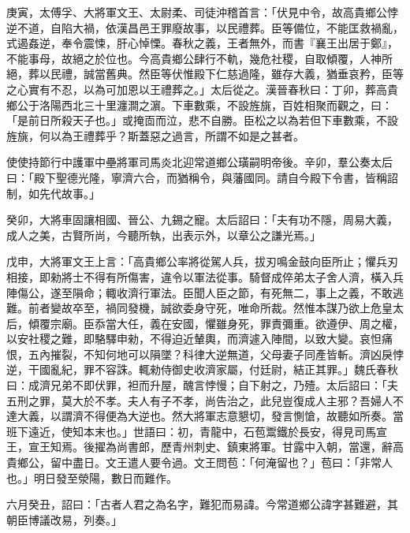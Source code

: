 \begin{pinyinscope}
庚寅，太傅孚、大將軍文王、太尉柔、司徒沖稽首言：「伏見中令，故高貴鄉公悖逆不道，自陷大禍，依漢昌邑王罪廢故事，以民禮葬。臣等備位，不能匡救禍亂，式遏姦逆，奉令震悚，肝心悼慄。春秋之義，王者無外，而書『襄王出居于鄭』，不能事母，故絕之於位也。今高貴鄉公肆行不軌，幾危社稷，自取傾覆，人神所絕，葬以民禮，誠當舊典。然臣等伏惟殿下仁慈過隆，雖存大義，猶垂哀矜，臣等之心實有不忍，以為可加恩以王禮葬之。」太后從之。漢晉春秋曰：丁卯，葬高貴鄉公于洛陽西北三十里瀍澗之濵。下車數乘，不設旌旐，百姓相聚而觀之，曰：「是前日所殺天子也。」或掩靣而泣，悲不自勝。臣松之以為若但下車數乘，不設旌旐，何以為王禮葬乎？斯蓋惡之過言，所謂不如是之甚者。

使使持節行中護軍中壘將軍司馬炎北迎常道鄉公璜嗣明帝後。辛卯，羣公奏太后曰：「殿下聖德光隆，寧濟六合，而猶稱令，與藩國同。請自今殿下令書，皆稱詔制，如先代故事。」

癸卯，大將車固讓相國、晉公、九錫之寵。太后詔曰：「夫有功不隱，周易大義，成人之美，古賢所尚，今聽所執，出表示外，以章公之謙光焉。」

戊申，大將軍文王上言：「高貴鄉公率將從駕人兵，拔刃鳴金鼓向臣所止；懼兵刃相接，即勑將士不得有所傷害，違令以軍法從事。騎督成倅弟太子舍人濟，橫入兵陣傷公，遂至隕命；輙收濟行軍法。臣聞人臣之節，有死無二，事上之義，不敢逃難。前者變故卒至，禍同發機，誠欲委身守死，唯命所裁。然惟本謀乃欲上危皇太后，傾覆宗廟。臣忝當大任，義在安國，懼雖身死，罪責彌重。欲遵伊、周之權，以安社稷之難，即駱驛申勑，不得迫近輦輿，而濟遽入陣間，以致大變。哀怛痛恨，五內摧裂，不知何地可以隕墜？科律大逆無道，父母妻子同產皆斬。濟凶戾悖逆，干國亂紀，罪不容誅。輒勑侍御史收濟家屬，付廷尉，結正其罪。」魏氏春秋曰：成濟兄弟不即伏罪，袒而升屋，醜言悖慢；自下射之，乃殪。太后詔曰：「夫五刑之罪，莫大於不孝。夫人有子不孝，尚告治之，此兒豈復成人主邪？吾婦人不達大義，以謂濟不得便為大逆也。然大將軍志意懇切，發言惻愴，故聽如所奏。當班下遠近，使知本末也。」世語曰：初，青龍中，石苞鬻鐵於長安，得見司馬宣王，宣王知焉。後擢為尚書郎，歷青州刺史、鎮東將軍。甘露中入朝，當還，辭高貴鄉公，留中盡日。文王遣人要令過。文王問苞：「何淹留也？」苞曰：「非常人也。」明日發至滎陽，數日而難作。

六月癸丑，詔曰：「古者人君之為名字，難犯而易諱。今常道鄉公諱字甚難避，其朝臣博議改易，列奏。」


\end{pinyinscope}